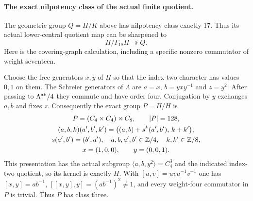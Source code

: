 \paragraph{The exact nilpotency class of the actual finite quotient.}
The geometric group $Q=\Pi/K$ above has nilpotency
class exactly $17$.  Thus its actual lower-central
quotient map can be sharpened to
\[
                            \Pi/\Gamma_{18}\Pi\twoheadrightarrow Q.
\]
Here is the covering-graph calculation, including a
specific nonzero commutator of weight seventeen.

Choose the free generators $x,y$ of $\Pi$ so that
the index-two character has values $0,1$ on them.
The Schreier generators of $\Lambda$ are
$a=x$, $b=yxy^{-1}$ and $z=y^2$.
After passing to $\Lambda^{\rm ab}/4$ they commute
and have order four.
Conjugation by $y$ exchanges $a,b$ and fixes $z$.
Consequently the exact group $P=\Pi/H$ is
\[
 \begin{gathered}
 P=(C_4\times C_4)\rtimes C_8,\qquad |P|=128,\\
 (a,b,k)(a',b',k')
   =\bigl((a,b)+s^k(a',b'),\,k+k'\bigr),\\
       s(a',b')=(b',a'),\quad
       a,b,a',b'\in\mathbb Z/4,\quad k,k'\in\mathbb Z/8,\\
                       x=(1,0,0),\qquad y=(0,0,1).
 \end{gathered}
\]
This presentation has the actual subgroup
$\langle a,b,y^2\rangle=C_4^3$ and the indicated
index-two quotient, so its kernel is exactly $H$.
With $[u,v]=uvu^{-1}v^{-1}$ one has
$[x,y]=ab^{-1}$,
$[[x,y],y]=(ab^{-1})^2\ne1$,
and every weight-four commutator in $P$ is trivial.
Thus $P$ has class three.

